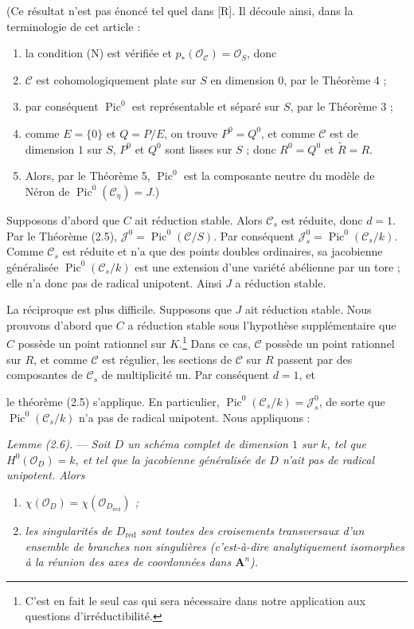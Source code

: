 \documentclass[10pt]{article}
\newcommand{\Pic}{\operatorname{Pic}}
\newcommand{\cO}{\mathcal O}
\newcommand{\A}{\mathbf A}
\begin{document}
(Ce résultat n'est pas énoncé tel quel dans [R]. Il découle ainsi, dans la terminologie de cet article :
\begin{enumerate}[label=\emph{\alph*)}]
\item la condition (N) est vérifiée et $p_*(\cO_{\mathscr C})=\cO_S$, donc
\item $\mathscr C$ est cohomologiquement plate sur $S$ en dimension $0$, par le Théorème 4 ;
\item par conséquent $\Pic^0$ est représentable et séparé sur $S$, par le Théorème 3 ;
\item comme $E=\{0\}$ et $Q=P/E$, on trouve $P^0=Q^0$, et comme $\mathscr C$ est de dimension $1$ sur $S$, $P^0$ et $Q^0$ sont lisses sur $S$ ; donc $R^0=Q^0$ et $\widetilde R=R$.
\item Alors, par le Théorème 5, $\Pic^0$ est la composante neutre du modèle de N\'eron de $\Pic^0(\mathscr C_\eta)=J$.)
\end{enumerate}

Supposons d'abord que $C$ ait réduction stable. Alors $\mathscr C_s$ est réduite, donc $d=1$. Par le Théorème (2.5), $\mathscr J^0=\Pic^0(\mathscr C/S)$. Par conséquent $\mathscr J_s^0=\Pic^0(\mathscr C_s/k)$. Comme $\mathscr C_s$ est réduite et n'a que des points doubles ordinaires, sa jacobienne généralisée $\Pic^0(\mathscr C_s/k)$ est une extension d'une variété abélienne par un tore ; elle n'a donc pas de radical unipotent. Ainsi $J$ a réduction stable.

La réciproque est plus difficile. Supposons que $J$ ait réduction stable. Nous prouvons d'abord que $C$ a réduction stable sous l'hypothèse supplémentaire que $C$ possède un point rationnel sur $K$.\footnote{C'est en fait le seul cas qui sera nécessaire dans notre application aux questions d'irréductibilité.} Dans ce cas, $\mathscr C$ possède un point rationnel sur $R$, et comme $\mathscr C$ est régulier, les sections de $\mathscr C$ sur $R$ passent par des composantes de $\mathscr C_s$ de multiplicité un. Par conséquent $d=1$, et

le théorème (2.5) s'applique. En particulier, $\Pic^0(\mathscr C_s/k)=\mathscr J_s^0$, de sorte que $\Pic^0(\mathscr C_s/k)$ n'a pas de radical unipotent. Nous appliquons :

\medskip
\noindent\emph{Lemme (2.6).} --- \emph{Soit $D$ un schéma complet de dimension $1$ sur $k$, tel que $H^0(\cO_D)=k$, et tel que la jacobienne généralisée de $D$ n'ait pas de radical unipotent. Alors}
\begin{enumerate}[label=(\roman*)]
\item \emph{$\chi(\cO_D)=\chi(\cO_{D_{\mathrm{red}}})$ ;}
\item \emph{les singularités de $D_{\mathrm{red}}$ sont toutes des croisements transversaux d'un ensemble de branches non singulières (c'est-à-dire analytiquement isomorphes à la réunion des axes de coordonnées dans $\A^n$).}
\end{enumerate}
\end{document}
